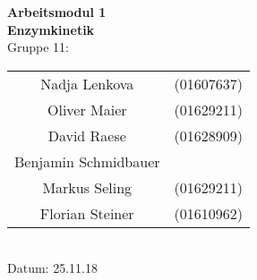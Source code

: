 \begin{titlepage}
  \begin{center}
    \phantom{hallo}
    \vspace{2cm}
    \Huge{\bfseries{Arbeitsmodul 1}}\\
    \vspace{1.5cm}
    \huge{\bfseries{Enzymkinetik}}\\
    \vspace{1.5cm}
    \huge{Gruppe 11}:\\
    \vspace{1cm}
    \begin{tabular}{cc}
      
      Nadja Lenkova & (01607637)\\
      Oliver Maier & (01629211)\\
      David Raese  & (01628909)\\
      Benjamin Schmidbauer & \\
      Markus Seling & (01629211)\\
      Florian Steiner & (01610962)\\
    \end{tabular} \\
    \vspace{1cm}
    Datum: 25.11.18
  \end{center}
\end{titlepage}